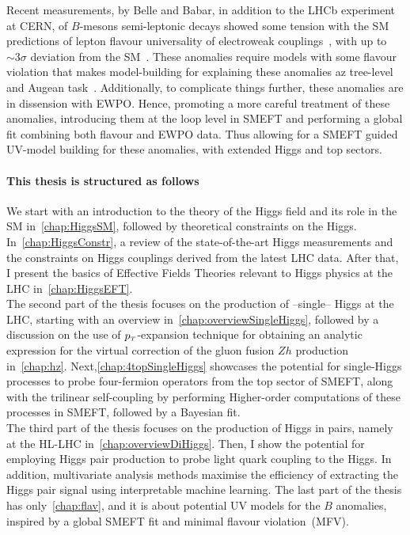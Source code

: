 Recent measurements, by  Belle and Babar, in addition to the LHCb experiment at CERN, of $B$-mesons semi-leptonic decays showed some tension with the SM predictions of lepton flavour universality of electroweak couplings~\cite{Aaij:2014ora,Aaij:2017vbb,Aaij:2019wad,Abdesselam:2019wac,LHCb:2021trn}, with up to $\sim 3\sigma$ deviation from the SM~\cite{Chatrchyan:2013bka,Aaij:2017vad,Aaboud:2018mst,Aaij:2020nol}. These anomalies require models with some flavour violation that makes model-building for explaining these anomalies az tree-level and Augean task~\cite{DiLuzio:2017vat,Calibbi:2017qbu,Bordone:2017bld,Barbieri:2017tuq,Assad:2017iib,Heeck:2018ntp,Fornal:2018dqn,Crivellin:2018yvo,Crivellin:2019dwb,Bordone:2019uzc}. Additionally, to complicate things further, these anomalies are in dissension with EWPO. Hence, promoting a more careful treatment of these anomalies, introducing them at the loop level in SMEFT and performing a global fit combining both flavour and EWPO data. Thus allowing for a SMEFT guided UV-model building for these anomalies, with extended Higgs and top sectors. \\

\paragraph{This thesis is structured as follows\color{Cayenne}{:}}
We start with an introduction to the theory of the Higgs field and its role in the SM in~\autoref{chap:HiggsSM}, followed by theoretical constraints on the Higgs. In~\autoref{chap:HiggsConstr}, a review of the state-of-the-art Higgs measurements and the constraints on Higgs couplings derived from the latest LHC data. After that, I present the basics of Effective Fields Theories relevant to Higgs physics at the LHC in~\autoref{chap:HiggsEFT}. \\ The second part of the thesis focuses on the production of --single-- Higgs at the LHC, starting with an overview in~\autoref{chap:overviewSingleHiggs}, followed by a discussion on the use of $p_{\scriptscriptstyle T}$-expansion technique for obtaining an analytic expression for the virtual correction of the gluon fusion $Zh$ production in~\autoref{chap:hz}. Next,\autoref{chap:4topSingleHiggs} showcases the potential for single-Higgs processes to probe four-fermion operators from the top sector of SMEFT, along with the trilinear self-coupling by performing Higher-order computations of these processes in SMEFT, followed by a Bayesian fit. \\ The third part of the thesis focuses on the production of Higgs in pairs, namely at the HL-LHC in~\autoref{chap:overviewDiHiggs}. Then, I show the potential for employing Higgs pair production to probe light quark coupling to the Higgs. In addition, multivariate analysis methods maximise the efficiency of extracting the Higgs pair signal using interpretable machine learning.  The last part of the thesis has only~\autoref{chap:flav}, and it is about potential UV models for the $B$ anomalies, inspired by a global SMEFT fit and minimal flavour violation~(MFV). 









